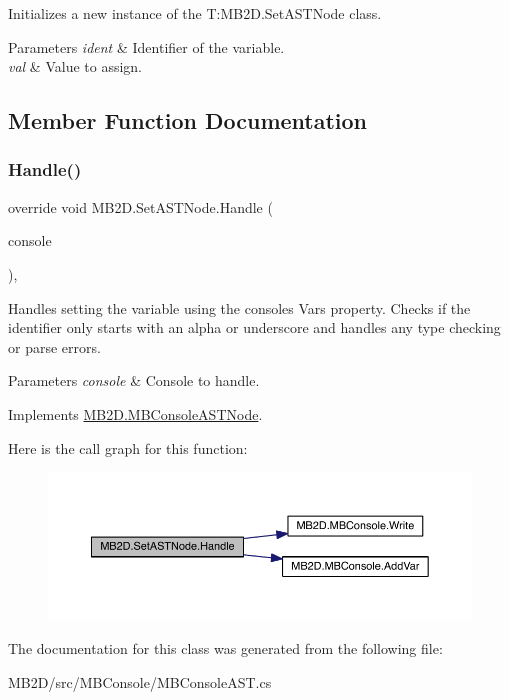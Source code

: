 Initializes a new instance of the T\+:\+M\+B2\+D.\+Set\+A\+S\+T\+Node class. 


\begin{DoxyParams}{Parameters}
{\em ident} & Identifier of the variable.\\
\hline
{\em val} & Value to assign.\\
\hline
\end{DoxyParams}


\subsection{Member Function Documentation}
\hypertarget{class_m_b2_d_1_1_set_a_s_t_node_a54eba248a545f6182c6a5509c4c1a6f2}{}\label{class_m_b2_d_1_1_set_a_s_t_node_a54eba248a545f6182c6a5509c4c1a6f2} 
\subsubsection{\texorpdfstring{Handle()}{Handle()}}
{\footnotesize\ttfamily override void M\+B2\+D.\+Set\+A\+S\+T\+Node.\+Handle (\begin{DoxyParamCaption}\item[{\hyperlink{class_m_b2_d_1_1_m_b_console}{M\+B\+Console}}]{console }\end{DoxyParamCaption})\hspace{0.3cm}{\ttfamily [inline]}, {\ttfamily [virtual]}}



Handles setting the variable using the consoles Vars property. Checks if the identifier only starts with an alpha or underscore and handles any type checking or parse errors. 


\begin{DoxyParams}{Parameters}
{\em console} & Console to handle.\\
\hline
\end{DoxyParams}


Implements \hyperlink{class_m_b2_d_1_1_m_b_console_a_s_t_node_aa70a49e61ab623698af4ed8fda4ebbf5}{M\+B2\+D.\+M\+B\+Console\+A\+S\+T\+Node}.

Here is the call graph for this function\+:\nopagebreak
\begin{figure}[H]
\begin{center}
\leavevmode
\includegraphics[width=350pt]{class_m_b2_d_1_1_set_a_s_t_node_a54eba248a545f6182c6a5509c4c1a6f2_cgraph}
\end{center}
\end{figure}


The documentation for this class was generated from the following file\+:\begin{DoxyCompactItemize}
\item 
M\+B2\+D/src/\+M\+B\+Console/M\+B\+Console\+A\+S\+T.\+cs\end{DoxyCompactItemize}

